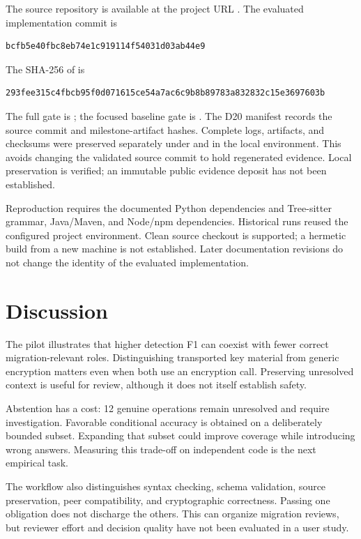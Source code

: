 \documentclass[conference,a4paper]{IEEEtran}
\begin{document}
The source repository is available at the project URL \cite{ref13}. The evaluated implementation commit is

\begin{lstlisting}
bcfb5e40fbc8eb74e1c919114f54031d03ab44e9
\end{lstlisting}

The SHA-256 of  is

\begin{lstlisting}
293fee315c4fbcb95f0d071615ce54a7ac6c9b8b89783a832832c15e3697603b
\end{lstlisting}

The full gate is ; the focused baseline gate is . The D20 manifest records the source commit and milestone-artifact hashes. Complete logs, artifacts, and checksums were preserved separately under  and  in the local environment. This avoids changing the validated source commit to hold regenerated evidence. Local preservation is verified; an immutable public evidence deposit has not been established.

Reproduction requires the documented Python dependencies and Tree-sitter grammar, Java/Maven, and Node/npm dependencies. Historical runs reused the configured project environment. Clean source checkout is supported; a hermetic build from a new machine is not established. Later documentation revisions do not change the identity of the evaluated implementation.

\section{Discussion}

The pilot illustrates that higher detection F1 can coexist with fewer correct migration-relevant roles. Distinguishing transported key material from generic encryption matters even when both use an encryption call. Preserving unresolved context is useful for review, although it does not itself establish safety.

Abstention has a cost: 12 genuine operations remain unresolved and require investigation. Favorable conditional accuracy is obtained on a deliberately bounded subset. Expanding that subset could improve coverage while introducing wrong answers. Measuring this trade-off on independent code is the next empirical task.

The workflow also distinguishes syntax checking, schema validation, source preservation, peer compatibility, and cryptographic correctness. Passing one obligation does not discharge the others. This can organize migration reviews, but reviewer effort and decision quality have not been evaluated in a user study.
\end{document}
